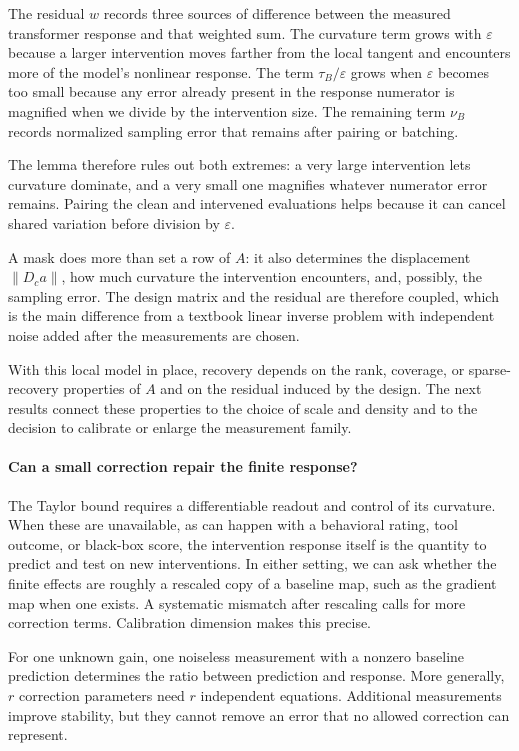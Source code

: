 \documentclass[sigconf,10pt,nonacm,balance=false]{acmart}
\newcommand{\eps}{\varepsilon}
\begin{document}
The residual $w$ records three sources of difference between the measured transformer response and that weighted sum. The curvature term grows with $\eps$ because a larger intervention moves farther from the local tangent and encounters more of the model's nonlinear response. The term $\tau_B/\eps$ grows when $\eps$ becomes too small because any error already present in the response numerator is magnified when we divide by the intervention size. The remaining term $\nu_B$ records normalized sampling error that remains after pairing or batching.

The lemma therefore rules out both extremes: a very large intervention lets curvature dominate, and a very small one magnifies whatever numerator error remains. Pairing the clean and intervened evaluations helps because it can cancel shared variation before division by $\eps$.

A mask does more than set a row of $A$: it also determines the displacement $\|D_ca\|$, how much curvature the intervention encounters, and, possibly, the sampling error. The design matrix and the residual are therefore coupled, which is the main difference from a textbook linear inverse problem with independent noise added after the measurements are chosen.

With this local model in place, recovery depends on the rank, coverage, or sparse-recovery properties of $A$ and on the residual induced by the design. The next results connect these properties to the choice of scale and density and to the decision to calibrate or enlarge the measurement family.

\paragraph{Can a small correction repair the finite response?}
The Taylor bound requires a differentiable readout and control of its curvature. When these are unavailable, as can happen with a behavioral rating, tool outcome, or black-box score, the intervention response itself is the quantity to predict and test on new interventions. In either setting, we can ask whether the finite effects are roughly a rescaled copy of a baseline map, such as the gradient map when one exists. A systematic mismatch after rescaling calls for more correction terms. Calibration dimension makes this precise.

For one unknown gain, one noiseless measurement with a nonzero baseline prediction determines the ratio between prediction and response. More generally, $r$ correction parameters need $r$ independent equations. Additional measurements improve stability, but they cannot remove an error that no allowed correction can represent.
\end{document}
